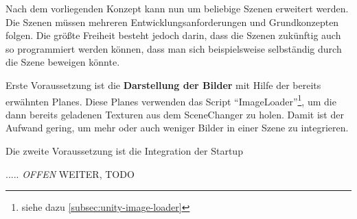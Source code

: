 Nach dem vorliegenden Konzept kann nun um beliebige Szenen erweitert werden. Die Szenen müssen mehreren Entwicklungsanforderungen und Grundkonzepten folgen. Die größte Freiheit besteht jedoch darin, dass die Szenen zukünftig auch so programmiert werden können, dass man sich beispielsweise selbständig durch die Szene beweigen könnte.

Erste Voraussetzung ist die \textbf{Darstellung der Bilder} mit Hilfe der bereits erwähnten Planes. Diese Planes verwenden das Script ``ImageLoader''\footnote{siehe dazu \ref{subsec:unity-image-loader}}, um die dann bereits geladenen Texturen aus dem SceneChanger zu holen. Damit ist der Aufwand gering, um mehr oder auch weniger Bilder in einer Szene zu integrieren.

Die zweite Voraussetzung ist die Integration der Startup


..... \emph{OFFEN} WEITER, TODO

